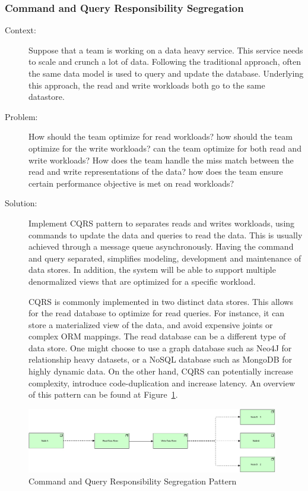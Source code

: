 \documentclass{bmcart}
\begin{document}
\subsubsection{Command and Query Responsibility Segregation}

\begin{description}
  \item[Context:] Suppose that a team is working on a data heavy service. This service needs to scale and crunch a lot of data. Following the traditional approach, often the same data model is used to query and update the database. Underlying this approach, the read and write workloads both go to the same datastore. 
  \item[Problem:] How should the team optimize for read workloads? how should the team optimize for the write workloads? can the team optimize for both read and write workloads? How does the team handle the miss match between the read and write representations of the data? how does the team ensure certain performance objective is met on read workloads?
  \item[Solution:] Implement CQRS pattern to separates reads and writes workloads, using commands to update the data and queries to read the data. This is usually achieved through a message queue asynchronously. Having the command and query separated, simplifies modeling, development and maintenance of data stores. In addition, the system will be able to support multiple denormalized views that are optimized for a specific workload. 

  CQRS is commonly implemented in two distinct data stores. This allows for the read database to optimize for read queries. For instance, it can store a materialized view of the data, and avoid expensive joints or complex ORM mappings. The read database can be a different type of data store. One might choose to use a graph database such as Neo4J for relationship heavy datasets, or a NoSQL database such as MongoDB for highly dynamic data. On the other hand, CQRS can potentially increase complexity, introduce code-duplication and increase latency. An overview of this pattern can be found at Figure~\ref{CQRS}.   
\end{description}

\begin{figure}[h]
  \includegraphics[width=11cm]{Media/Command and Query Responsibility Segregation.jpg}
  \caption{Command and Query Responsibility Segregation Pattern}
  \label{CQRS}
\end{figure}
\end{document}

